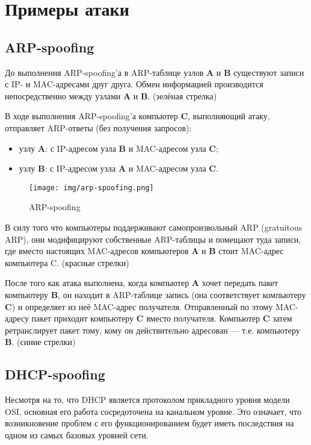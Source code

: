 \section{Примеры атаки}

\subsection{ARP-spoofing}

До выполнения ARP-spoofing'а в ARP-таблице узлов \textbf{A} и \textbf{B} существуют записи с IP- и MAC-адресами друг друга. Обмен информацией производится непосредственно между узлами \textbf{A} и \textbf{B}. (зелёная стрелка)

В ходе выполнения ARP-spoofing'а компьютер \textbf{C}, выполняющий атаку, отправляет ARP-ответы (без получения запросов):

\begin{itemize}
	\item узлу \textbf{A}: с IP-адресом узла \textbf{B} и MAC-адресом узла \textbf{C};
	\item узлу \textbf{B}: с IP-адресом узла \textbf{A} и MAC-адресом узла \textbf{C}.
\end{itemize}

\begin{figure}[H]
	\centering
	\texttt{[image: img/arp-spoofing.png]}
	\caption{ARP-spoofing}
\end{figure}

В силу того что компьютеры поддерживают самопроизвольный ARP (gratuitous ARP), они модифицируют собственные ARP-таблицы и помещают туда записи, где вместо настоящих MAC-адресов компьютеров \textbf{A} и \textbf{B} стоит MAC-адрес компьютера C. (красные стрелки)

После того как атака выполнена, когда компьютер \textbf{A} хочет передать пакет компьютеру \textbf{B}, он находит в ARP-таблице запись (она соответствует компьютеру \textbf{C}) и определяет из неё MAC-адрес получателя. Отправленный по этому MAC-адресу пакет приходит компьютеру \textbf{C} вместо получателя. Компьютер \textbf{C} затем ретранслирует пакет тому, кому он действительно адресован — т.е. компьютеру \textbf{B}. (синие стрелки)


\subsection{DHCP-spoofing}

Несмотря на то, что DHCP является протоколом прикладного уровня модели OSI, основная его работа сосредоточена на канальном уровне. Это означает, что возникновение проблем с его функционированием будет иметь последствия на одном из самых базовых уровней сети.

